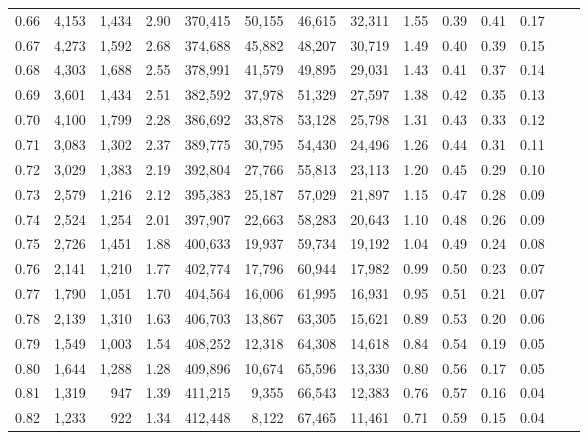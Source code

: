 \begin{tabular}{rrrrrrrrrrrrrr}
0.66 &   4,153 &  1,434 &    2.90 &  370,415 &   50,155 &  46,615 &  32,311 &  1.55 &  0.39 &  0.41 &      0.17 \\
0.67 &   4,273 &  1,592 &    2.68 &  374,688 &   45,882 &  48,207 &  30,719 &  1.49 &  0.40 &  0.39 &      0.15 \\
0.68 &   4,303 &  1,688 &    2.55 &  378,991 &   41,579 &  49,895 &  29,031 &  1.43 &  0.41 &  0.37 &      0.14 \\
0.69 &   3,601 &  1,434 &    2.51 &  382,592 &   37,978 &  51,329 &  27,597 &  1.38 &  0.42 &  0.35 &      0.13 \\
0.70 &   4,100 &  1,799 &    2.28 &  386,692 &   33,878 &  53,128 &  25,798 &  1.31 &  0.43 &  0.33 &      0.12 \\
0.71 &   3,083 &  1,302 &    2.37 &  389,775 &   30,795 &  54,430 &  24,496 &  1.26 &  0.44 &  0.31 &      0.11 \\
0.72 &   3,029 &  1,383 &    2.19 &  392,804 &   27,766 &  55,813 &  23,113 &  1.20 &  0.45 &  0.29 &      0.10 \\
0.73 &   2,579 &  1,216 &    2.12 &  395,383 &   25,187 &  57,029 &  21,897 &  1.15 &  0.47 &  0.28 &      0.09 \\
0.74 &   2,524 &  1,254 &    2.01 &  397,907 &   22,663 &  58,283 &  20,643 &  1.10 &  0.48 &  0.26 &      0.09 \\
0.75 &   2,726 &  1,451 &    1.88 &  400,633 &   19,937 &  59,734 &  19,192 &  1.04 &  0.49 &  0.24 &      0.08 \\
0.76 &   2,141 &  1,210 &    1.77 &  402,774 &   17,796 &  60,944 &  17,982 &  0.99 &  0.50 &  0.23 &      0.07 \\
0.77 &   1,790 &  1,051 &    1.70 &  404,564 &   16,006 &  61,995 &  16,931 &  0.95 &  0.51 &  0.21 &      0.07 \\
0.78 &   2,139 &  1,310 &    1.63 &  406,703 &   13,867 &  63,305 &  15,621 &  0.89 &  0.53 &  0.20 &      0.06 \\
0.79 &   1,549 &  1,003 &    1.54 &  408,252 &   12,318 &  64,308 &  14,618 &  0.84 &  0.54 &  0.19 &      0.05 \\
0.80 &   1,644 &  1,288 &    1.28 &  409,896 &   10,674 &  65,596 &  13,330 &  0.80 &  0.56 &  0.17 &      0.05 \\
0.81 &   1,319 &    947 &    1.39 &  411,215 &    9,355 &  66,543 &  12,383 &  0.76 &  0.57 &  0.16 &      0.04 \\
0.82 &   1,233 &    922 &    1.34 &  412,448 &    8,122 &  67,465 &  11,461 &  0.71 &  0.59 &  0.15 &      0.04 \\

\end{tabular}
